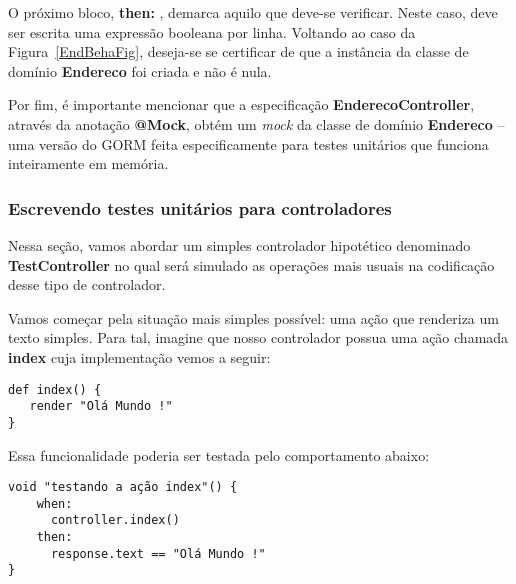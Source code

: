 \vspace{0.2cm}

O próximo bloco, {\bf then:} , demarca aquilo que deve-se verificar. Neste caso,
deve  ser  escrita  uma  expressão  booleana  por linha.  Voltando  ao  caso  da
Figura~\ref{EndBehaFig}, deseja-se se certificar de que a instância da classe de
domínio {\bf Endereco} foi criada e não é nula.

\vspace{0.2cm}

Por fim,  é importante mencionar  que a especificação  {\bf EnderecoController},
através da anotação  {\bf @Mock}, obtém um {\it mock} da  classe de domínio {\bf
  Endereco} --  uma versão do  GORM feita especificamente para  testes unitários
que funciona inteiramente em memória.

\subsubsection{Escrevendo testes unitários para controladores}

\vspace{0.5cm}

Nessa  seção, vamos abordar  um simples  controlador hipotético  denominado {\bf
  TestController} no qual será simulado  as operações mais usuais na codificação
desse tipo de controlador.

\vspace{0.3cm}

  Vamos começar pela situação mais simples
possível: uma ação  que renderiza um texto simples. Para  tal, imagine que nosso
controlador  possua uma  ação chamada  {\bf  index} cuja  implementação vemos  a
seguir: 

\begin{mdframed}
\begin{footnotesize}
\begin{verbatim}
def index() {
   render "Olá Mundo !"
}
\end{verbatim}
\end{footnotesize}
\end{mdframed}

\vspace{0.2cm}

Essa funcionalidade poderia ser testada pelo comportamento abaixo:

\vspace{0.2cm}

\begin{mdframed}
\begin{footnotesize}
\begin{verbatim}
void "testando a ação index"() {
    when:
      controller.index()
    then:
      response.text == "Olá Mundo !"
}
\end{verbatim}
\end{footnotesize}
\end{mdframed}

